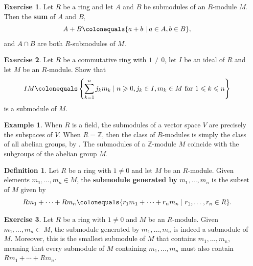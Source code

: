 \documentclass[12pt]{report}
\numberwithin{equation}{section}
\numberwithin{theorem}{chapter}
\theoremstyle{definition}
\newtheorem{definition}[theorem]{Definition}
\newtheorem{example}[theorem]{Example}
\newtheorem{exercise}{Exercise}
\newtheorem*{basic properties}{Basic Properties}
\newtheorem*{Important Remark}{Important Remark}
\newcommand{\df}[1]{{\bf #1}\index{#1}}
\newcommand{\Z}{\mathbb{Z}}
\begin{document}
\begin{exercise}\label{sum and intersection of submods}
	Let $R$ be a ring and let $A$ and $B$ be submodules of an $R$-module $M$. Then the {\bf sum} of $A$ and $B$,
	$$A + B \colonequals \{ a + b \mid a \in A, b \in B \},$$
	and $A \cap B$ are both $R$-submodules of $M$.
\end{exercise}

\begin{exercise}
Let $R$ be a commutative ring with $1\neq 0$, let $I$ be an ideal of $R$ and let $M$ be an $R$-module. Show that
$$IM \colonequals \left\{\sum_{k=1}^n j_km_k \mid n \geqslant 0, j_k \in I, m_k \in M \text{ for } 1 \leqslant k \leqslant n \right\}$$
is a submodule of $M$.
\end{exercise}


\begin{example}
When $R$ is a field, the submodules of a vector space $V$ are precisely the subspaces of $V$.
When $R = \Z$, then the class of $R$-modules is simply the class of all abelian groups, by . The submodules of a $\Z$-module $M$ coincide with the subgroups of the abelian group $M$. 
\end{example}




\begin{definition}
	Let $R$ be a ring with $1 \neq 0$ and let $M$ be an $R$-module. Given elements $m_1, \ldots, m_n \in M$, the \df{submodule generated by} $m_1, \ldots, m_n$ is the subset of $M$ given by
	$$Rm_1 + \cdots + Rm_n \colonequals \{ r_1 m_1 + \cdots + r_n m_n \mid r_1, \ldots, r_n \in R\}.$$
\end{definition}

\begin{exercise}
Let $R$ be a ring with $1 \neq 0$ and $M$ be an $R$-module. Given $m_1, \ldots, m_n \in~M$, the submodule generated by $m_1, \ldots, m_n$ is indeed a submodule of $M$. Moreover, this is the smallest submodule of $M$ that contains $m_1, \ldots, m_n$, meaning that every submodule of $M$ containing $m_1, \ldots, m_n$ must also contain $R m_1 + \cdots + R m_n$.
\end{exercise}


\end{document}
